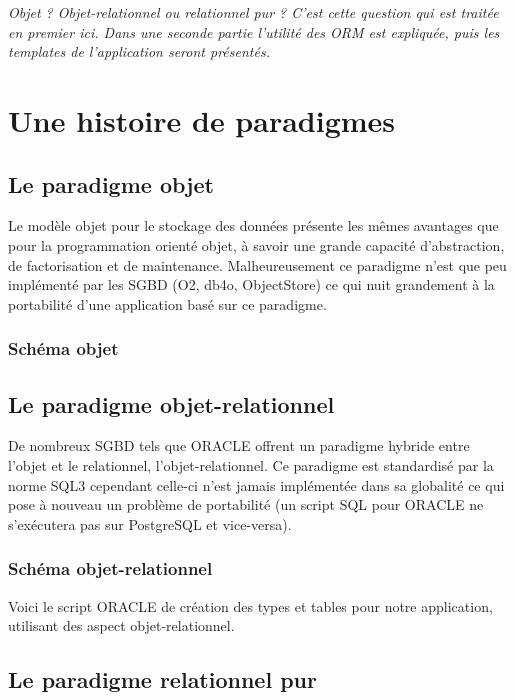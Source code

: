 \textit{Objet ? Objet-relationnel ou relationnel pur ? C'est cette question qui est traitée en premier ici. Dans une seconde partie l'utilité des ORM est expliquée, puis les templates de l'application seront présentés.}

\section{Une histoire de paradigmes}
\subsection{Le paradigme objet}

Le modèle objet pour le stockage des données présente les mêmes avantages que pour la programmation orienté objet, à savoir une grande capacité d'abstraction, de factorisation et de maintenance. Malheureusement ce paradigme n'est que peu implémenté par les SGBD (O2, db4o, ObjectStore) ce qui nuit grandement à la portabilité d'une application basé sur ce paradigme.

\subsubsection{Schéma objet}


\subsection{Le paradigme objet-relationnel}

De nombreux SGBD tels que ORACLE offrent un paradigme hybride entre l'objet et le relationnel, l'objet-relationnel.
Ce paradigme est standardisé par la norme SQL3 cependant celle-ci n'est jamais implémentée dans sa globalité ce qui pose à nouveau un problème de portabilité (un script SQL pour ORACLE ne s'exécutera pas sur PostgreSQL et vice-versa).

\subsubsection{Schéma objet-relationnel}

Voici le script ORACLE de création des types et tables pour notre application, utilisant des aspect objet-relationnel.


\subsection{Le paradigme relationnel pur}

